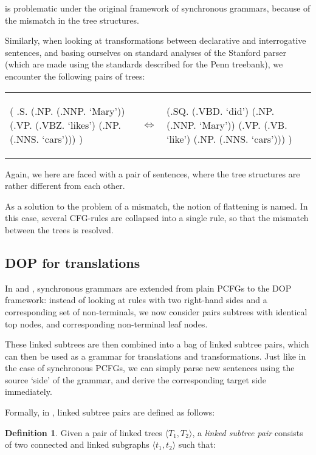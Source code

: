 \documentclass[a4paper]{article}
\theoremstyle{definition}
\newtheorem{definition}[theorem]{Definition}
\begin{document}
{{is problematic under the original framework of synchronous grammars, because of
the mismatch in the tree structures.

Similarly, when looking at transformations between declarative and
interrogative sentences, and basing ourselves on standard analyses of the
Stanford parser (which are made using the standards described for the Penn
treebank), we encounter the following pairs of trees:

\begin{tabular}{lll}
\begin{parsetree}
( .S.
    (.NP. (.NNP. `Mary'))
    (.VP. (.VBZ. `likes')
      (.NP. (.NNS. `cars')))
)
\end{parsetree}
& $\iff$ &
\begin{parsetree}
  (.SQ. (.VBD. `did')
    (.NP. (.NNP. `Mary'))
    (.VP. (.VB. `like')
      (.NP. (.NNS. `cars')))
    )
\end{parsetree}
\end{tabular}

Again, we here are faced with a pair of sentences, where the tree structures
are rather different from each other.

As a solution to the problem of a mismatch, the notion of flattening is named.
In this case, several CFG-rules are collapsed into a single rule, so that the
mismatch between the trees is resolved.

\subsection{DOP for translations}

In \cite{Po} and \cite{Po2}, synchronous grammars are extended from plain PCFGs
to the DOP framework: instead of looking at rules with two right-hand sides and
a corresponding set of non-terminals, we now consider pairs subtrees with
identical top nodes, and corresponding non-terminal leaf nodes.

These linked subtrees are then combined into a bag of linked subtree pairs,
which can then be used as a grammar for translations and transformations. Just
like in the case of synchronous PCFGs, we can simply parse new sentences using
the source `side' of the grammar, and derive the corresponding target side
immediately.

Formally, in \cite{Po}, linked subtree pairs are defined as follows:

\begin{definition}
Given a pair of linked trees $\langle T_1, T_2 \rangle$, a \emph{linked subtree
pair} consists of two connected and linked subgraphs $\langle t_1, t_2 \rangle$
such that:


\end{definition}}}
\end{document}
